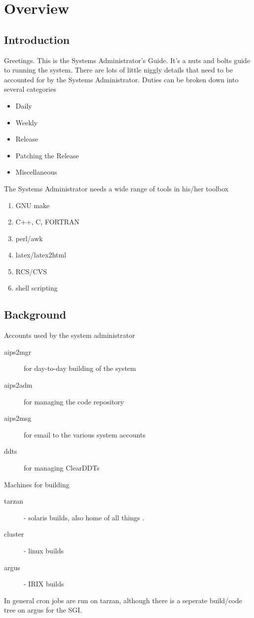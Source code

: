 \chapter{Overview}

\section{Introduction}
Greetings.  This is the \aipspp Systems Administrator's Guide.  It's a nuts and bolts guide to
running the system.  There are lots of little niggly details that need to be accounted for by
the \aipspp Systems Administrator.  Duties can be broken down into several categories
\begin{itemize}
\item Daily
\item Weekly
\item Release
\item Patching the Release
\item Miscellaneous
\end{itemize}

The \aipspp Systems Administrator needs a wide range of tools in his/her toolbox

\begin{enumerate}
\item GNU make
\item C++, C, FORTRAN
\item perl/awk
\item latex/latex2html
\item RCS/CVS
\item shell scripting
\end{enumerate}

\section{Background}

Accounts used by the \aipspp system administrator
\begin{description}
\item[aips2mgr] for day-to-day building of the system
\item[aips2adm] for managing the code repository
\item[aips2msg] for email to the various \aipspp system accounts
\item[ddts] for managing ClearDDTs
\end{description}

Machines for building \aipspp
\begin{description}
\item[tarzan] - solaris builds, also home of all things \aipspp.
\item[cluster] - linux builds
\item[argus] - IRIX builds
\end{description}

In general cron jobs are run on tarzan, although there is a seperate build/code tree on argus for
the SGI.
